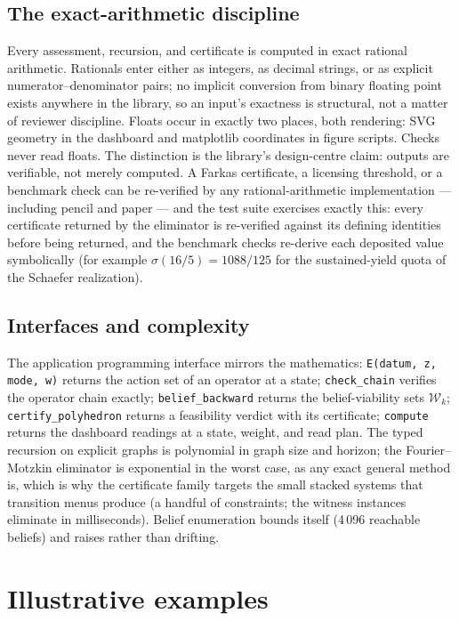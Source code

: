 \documentclass[3p,11pt]{elsarticle}
\begin{document}
\subsection{The exact-arithmetic discipline}\label{sec:exactness}

Every assessment, recursion, and certificate is computed in exact rational
arithmetic. Rationals enter either as integers, as decimal strings, or as
explicit numerator--denominator pairs; no implicit conversion from binary
floating point exists anywhere in the library, so an input's exactness is
structural, not a matter of reviewer discipline. Floats occur in exactly two
places, both rendering: SVG geometry in the dashboard and matplotlib
coordinates in figure scripts. Checks never read floats. The distinction is
the library's design-centre claim: outputs are verifiable, not merely
computed. A Farkas certificate, a licensing threshold, or a benchmark check
can be re-verified by any rational-arithmetic implementation --- including
pencil and paper --- and the test suite exercises exactly this: every
certificate returned by the eliminator is re-verified against its defining
identities before being returned, and the benchmark checks re-derive each
deposited value symbolically (for example $\sigma(16/5) = 1088/125$ for the
sustained-yield quota of the Schaefer realization).

\subsection{Interfaces and complexity}\label{sec:api}

The application programming interface mirrors the mathematics:
\texttt{E(datum, z, mode, w)} returns the action set of an operator at a
state; \texttt{check\_chain} verifies the operator chain exactly;
\texttt{belief\_backward} returns the belief-viability sets
$\mathcal{W}_k$; \texttt{certify\_polyhedron} returns a feasibility verdict
with its certificate; \texttt{compute} returns the dashboard readings at a
state, weight, and read plan. The typed recursion on explicit graphs is
polynomial in graph size and horizon; the Fourier--Motzkin eliminator is
exponential in the worst case, as any exact general method is, which is why
the certificate family targets the small stacked systems that transition
menus produce (a handful of constraints; the witness instances eliminate in
milliseconds). Belief enumeration bounds itself (4\,096 reachable beliefs)
and raises rather than drifting.

\section{Illustrative examples}\label{sec:examples}
\end{document}
